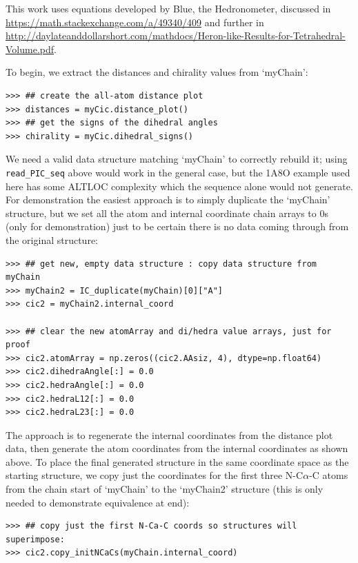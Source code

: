This work uses equations developed by Blue, the Hedronometer,
discussed in \url{https://math.stackexchange.com/a/49340/409} and further in
\url{http://daylateanddollarshort.com/mathdocs/Heron-like-Results-for-Tetrahedral-Volume.pdf}.

To begin, we extract the distances and chirality values from `myChain':

\begin{verbatim}
>>> ## create the all-atom distance plot
>>> distances = myCic.distance_plot()
>>> ## get the signs of the dihedral angles
>>> chirality = myCic.dihedral_signs()
\end{verbatim}

We need a valid data structure matching `myChain' to correctly rebuild it; using
\texttt{read\_PIC\_seq\(\)} above would work in the general case, but the 1A8O example
used here has some ALTLOC complexity which the sequence alone would not generate.
For demonstration the easiest approach is to simply duplicate the `myChain'
structure, but we set all the atom and internal coordinate chain arrays to 0s
(only for demonstration) just to be certain there is no data coming through from the
original structure:

\begin{verbatim}
>>> ## get new, empty data structure : copy data structure from myChain
>>> myChain2 = IC_duplicate(myChain)[0]["A"]
>>> cic2 = myChain2.internal_coord

>>> ## clear the new atomArray and di/hedra value arrays, just for proof
>>> cic2.atomArray = np.zeros((cic2.AAsiz, 4), dtype=np.float64)
>>> cic2.dihedraAngle[:] = 0.0
>>> cic2.hedraAngle[:] = 0.0
>>> cic2.hedraL12[:] = 0.0
>>> cic2.hedraL23[:] = 0.0
\end{verbatim}

The approach is to regenerate the internal coordinates from the distance plot
data, then generate the atom coordinates from the internal coordinates as shown
above.  To place the final generated structure in the same coordinate space as the
starting structure, we copy just the coordinates for the first three N-C$\alpha$-C
atoms from the chain start of `myChain' to the `myChain2' structure (this is only needed
to demonstrate equivalence at end):

\begin{verbatim}
>>> ## copy just the first N-Ca-C coords so structures will superimpose:
>>> cic2.copy_initNCaCs(myChain.internal_coord)
\end{verbatim}

